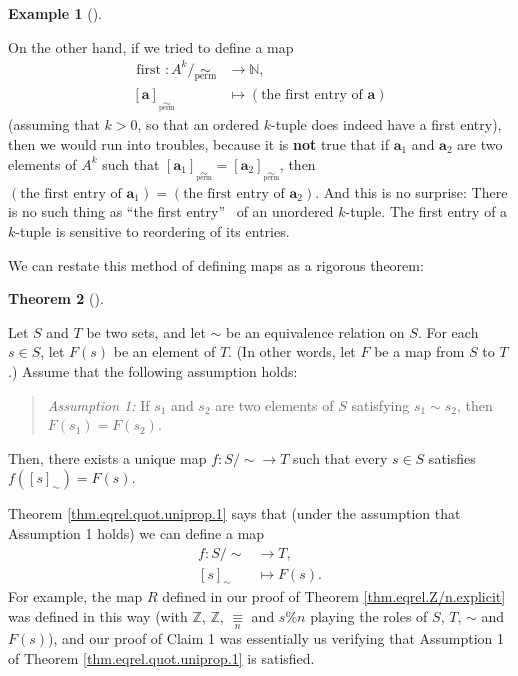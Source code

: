 \documentclass[numbers=enddot,12pt,final,onecolumn,notitlepage]{scrartcl}%
\numberwithin{exer}{subsection}
\theoremstyle{definition}
\newtheorem{theo}{Theorem}[subsection]
\newenvironment{theorem}[1][]
{\begin{theo}[#1]\begin{leftbar}}
{\end{leftbar}\end{theo}}
\newtheorem{exam}[theo]{Example}
\newenvironment{example}[1][]
{\begin{exam}[#1]\begin{leftbar}}
{\end{leftbar}\end{exam}}
\newenvironment{statement}{\begin{quote}}{\end{quote}}
\newenvironment{fineprint}{\begin{small}}{\end{small}}
\begin{document}
\begin{fineprint}
\begin{example}
On the other hand, if we tried to define a map%
\begin{align*}
\operatorname*{first}:\left.  A^{k}/\underset{\operatorname*{perm}}{\sim
}\right.   &  \rightarrow\mathbb{N},\\
\left[  \mathbf{a}\right]  _{\underset{\operatorname*{perm}}{\sim}}  &
\mapsto\left(  \text{the first entry of }\mathbf{a}\right)
\end{align*}
(assuming that $k>0$, so that an ordered $k$-tuple does indeed have a first
entry), then we would run into troubles, because it is \textbf{not} true that
if $\mathbf{a}_{1}$ and $\mathbf{a}_{2}$ are two elements of $A^{k}$ such that
$\left[  \mathbf{a}_{1}\right]  _{\underset{\operatorname*{perm}}{\sim}%
}=\left[  \mathbf{a}_{2}\right]  _{\underset{\operatorname*{perm}}{\sim}}$,
then $\left(  \text{the first entry of }\mathbf{a}_{1}\right)  =\left(
\text{the first entry of }\mathbf{a}_{2}\right)  $. And this is no surprise:
There is no such thing as \textquotedblleft the first entry\textquotedblright%
\ of an unordered $k$-tuple. The first entry of a $k$-tuple is sensitive to
reordering of its entries.
\end{example}
\end{fineprint}

We can restate this method of defining maps as a rigorous theorem:

\begin{theorem}
\label{thm.eqrel.quot.uniprop.1}Let $S$ and $T$ be two sets, and let $\sim$ be
an equivalence relation on $S$. For each $s\in S$, let $F\left(  s\right)  $
be an element of $T$. (In other words, let $F$ be a map from $S$ to $T$.)
Assume that the following assumption holds:

\begin{statement}
\textit{Assumption 1:} If $s_{1}$ and $s_{2}$ are two elements of $S$
satisfying $s_{1}\sim s_{2}$, then $F\left(  s_{1}\right)  =F\left(
s_{2}\right)  $.
\end{statement}

Then, there exists a unique map $f:\left.  S/\sim\right.  \rightarrow T$ such
that every $s\in S$ satisfies $f\left(  \left[  s\right]  _{\sim}\right)
=F\left(  s\right)  $.
\end{theorem}

Theorem \ref{thm.eqrel.quot.uniprop.1} says that (under the assumption that
Assumption 1 holds) we can define a map%
\begin{align*}
f:\left.  S/\sim\right.   &  \rightarrow T,\\
\left[  s\right]  _{\sim}  &  \mapsto F\left(  s\right)  .
\end{align*}
For example, the map $R$ defined in our proof of Theorem
\ref{thm.eqrel.Z/n.explicit} was defined in this way (with $\mathbb{Z}$,
$\mathbb{Z}$, $\underset{n}{\equiv}$ and $s\%n$ playing the roles of $S$, $T$,
$\sim$ and $F\left(  s\right)  $), and our proof of Claim 1 was essentially us
verifying that Assumption 1 of Theorem \ref{thm.eqrel.quot.uniprop.1} is satisfied.
\end{document}
